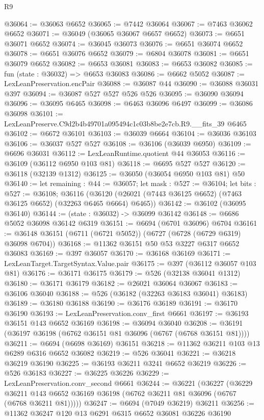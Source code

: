 \begin{lexlean}{R9}
\begin{coremodule}
@36064 := @36063 @6652
@36065 := @7442 @36064
@36067 := @7463 @36062 @6652
@36071 := @36049 (@36065 @36067 @6657 @6652)
@36073 := @6651 @36071 @6652
@36074 := @36045 @36073
@36076 := @6651 @36074 @6652
@36078 := @6651 @36076 @6652
@36079 := @6804 @36078
@36081 := @6651 @36079 @6652
@36082 := @6653 @36081
@36083 := @6653 @36082
@36085 := fun (state : @36032) => @6653 @36083
@36086 := @6662 @5052
@36087 := LexLeanPreservation.encPair
@36088 := @36087 @44
@36090 := @36088 @36031 @397
@36094 := @36087 @527 @527 @526 @526
@36095 := @36090 @36094
@36096 := @36095 @6465
@36098 := @6463 @36096 @6497
@36099 := @36086 @36098
@36101 := LexLeanPreserve.C9d2b4b49701a095494c1c03b8be2e7cb.R9.__fits_39 @6465
@36102 := @6672 @36101
@36103 := @36039 @6664
@36104 := @36036 @36103
@36106 := @36037 @527 @527
@36108 := @36106 (@36039 @6950)
@36109 := @6696 @36031
@36112 := LexLeanRuntime.quotient @44 @36053
@36116 := @36109 (@36112 @6950 @103 @81)
@36118 := @6695 @527 @527
@36120 := @36118 (@32139 @1312)
@36125 := @36050 (@36054 @6950 @103 @81) @50
@36140 := let remaining : @44 := @36057;
  let mask : @527 := @36104;
  let bits : @527 := @36108;
  @36116 (@36120 (@26021 (@7443 @36125 @6652) (@7463 @36125 @6652) (@32263 @6465 @6664) @6465))
@36142 := @36102 (@36095 @36140)
@36144 := (state : @36032) -> @36099 @36142
@36148 := @6686 @5052 @36098 @36142 @6319
@36151 := @6694 (@6701 @36096) @6704
@36161 := @36148 @36151 (@6711 (@6721 @5052)) (@6727 (@6728 (@6729 @6319) @36098 @6704))
@36168 := @11362 @36151 @50 @53 @3227 @6317 @6652 @36083
@36169 := @397 @36057
@36170 := @36168 @36169
@36171 := LexLeanTarget.TargetSyntax.Value.pair
@36175 := @397 (@36112 @36057 @103 @81)
@36176 := @36171 @36175
@36179 := @526 (@32138 @36041 @1312)
@36180 := @36171 @36179
@36182 := @26021 @36064 @36067
@36183 := @36106 @36040
@36188 := @526 (@36182 (@32263 @36183 @36041) @36183)
@36189 := @36180 @36188
@36190 := @36176 @36189
@36191 := @36170 @36190
@36193 := LexLeanPreservation.conv_first @6661
@36197 := @36193 @36151 @143 @6652 @36169
@36198 := @36094 @36040
@36208 := @36191 (@36197 @36198 (@6762 @36151 @81 @36096 (@6767 (@6768 @36151 @81))))
@36211 := @6694 (@6698 @36169) @36151
@36218 := @11362 @36211 @103 @13 @6289 @6316 @6652 @36082
@36219 := @526 @36041
@36221 := @36218 @36219 @36190
@36225 := @36193 @36211 @3241 @6652 @36219
@36226 := @526 @36183
@36227 := @36225 @36226
@36229 := LexLeanPreservation.conv_second @6661
@36244 := @36221
    (@36227
      (@36229 @36211 @143 @6652 @36169 @36198 (@6762 @36211 @81 @36096 (@6767 (@6768 @36211 @81)))))
@36247 := @6694 (@7049 @36219) @36211
@36256 := @11362 @36247 @120 @13 @6291 @6315 @6652 @36081 @36226 @36190

\end{coremodule}
\end{lexlean}
